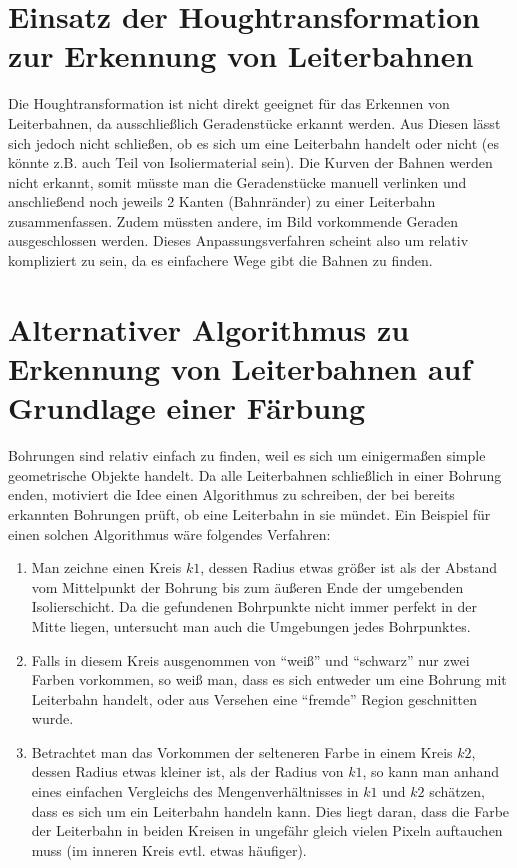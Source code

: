 \section{Einsatz der Houghtransformation zur Erkennung von Leiterbahnen}
Die Houghtransformation ist nicht direkt geeignet für das Erkennen von Leiterbahnen, da ausschließlich Geradenstücke erkannt werden. Aus Diesen lässt sich jedoch nicht schließen, ob es sich um eine Leiterbahn handelt oder nicht (es könnte z.B. auch Teil von Isoliermaterial sein). \newline
Die Kurven der Bahnen werden nicht erkannt, somit müsste man die Geradenstücke manuell verlinken und anschließend noch jeweils 2 Kanten (Bahnränder) zu einer Leiterbahn zusammenfassen. Zudem müssten andere, im Bild vorkommende Geraden ausgeschlossen werden. \newline
Dieses Anpassungsverfahren scheint also um relativ kompliziert zu sein, da es einfachere Wege gibt die Bahnen zu finden.  

\section{Alternativer Algorithmus zu Erkennung von Leiterbahnen auf Grundlage einer Färbung}
Bohrungen sind relativ einfach zu finden, weil es sich um einigermaßen simple geometrische Objekte handelt. Da alle Leiterbahnen schließlich in einer Bohrung enden, motiviert die Idee einen Algorithmus zu schreiben, der bei bereits erkannten Bohrungen prüft, ob eine Leiterbahn in sie mündet.\newline
Ein Beispiel für einen solchen Algorithmus wäre folgendes Verfahren: \newline
\begin{enumerate}
\item Man zeichne einen Kreis $k1$, dessen Radius etwas größer ist als der Abstand vom Mittelpunkt der Bohrung bis zum äußeren Ende der umgebenden Isolierschicht. \newline
Da die gefundenen Bohrpunkte nicht immer perfekt in der Mitte liegen, untersucht man auch die Umgebungen jedes Bohrpunktes.
\item Falls in diesem Kreis ausgenommen von “weiß” und “schwarz” nur zwei Farben vorkommen, so weiß man, dass es sich entweder um eine Bohrung mit Leiterbahn handelt, oder aus Versehen eine “fremde” Region geschnitten wurde. 
\item Betrachtet man das Vorkommen der selteneren Farbe in einem Kreis $k2$, dessen Radius etwas kleiner ist, als der Radius von $k1$, so kann man anhand eines einfachen Vergleichs des Mengenverhältnisses in $k1$ und $k2$ schätzen, dass es sich um ein Leiterbahn handeln kann. \newline
Dies liegt daran, dass die Farbe der Leiterbahn in beiden Kreisen in ungefähr gleich vielen Pixeln auftauchen muss (im inneren Kreis evtl. etwas häufiger).
\end{enumerate}


